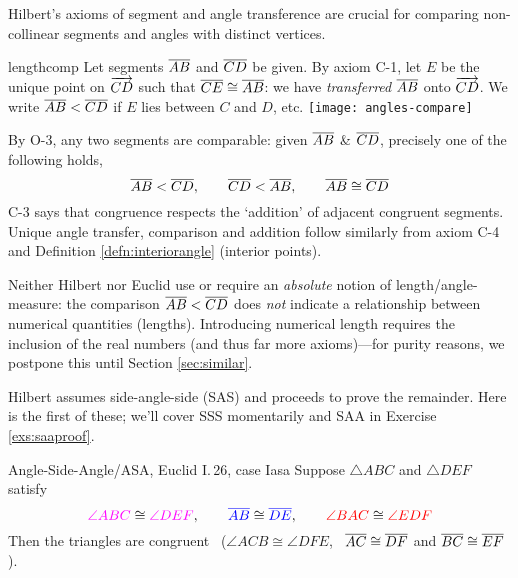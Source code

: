 
Hilbert's axioms of segment and angle transference are crucial for comparing non-collinear segments and angles with distinct vertices.


\begin{defn}[lower separated=false, sidebyside, sidebyside align=top seam, sidebyside gap=0pt, righthand width=0.35\linewidth]{}{lengthcomp}
	Let segments $\overline{AB}$ and $\overline{CD}$ be given.\smallbreak
	By axiom C-1, let $E$ be the unique point on $\overrightarrow{CD}$ such that $\overline{CE}\cong\overline{AB}$: we have \emph{transferred} $\overline{AB}$ onto $\overrightarrow{CD}$.\smallbreak
	We write $\overline{AB}<\overline{CD}$ if $E$ lies between $C$ and $D$, etc.
	\tcblower
	\flushright
	\texttt{[image: angles-compare]}
\end{defn}

By O-3, any two segments are comparable: given $\overline{AB}$ \& $\overline{CD}$, precisely one of the following holds,
\[
	\overline{AB}<\overline{CD}, \qquad \overline{CD}<\overline{AB}, \qquad\overline{AB}\cong\overline{CD}
\]
C-3 says that congruence respects the `addition' of adjacent congruent segments. Unique angle transfer, comparison and addition follow similarly from axiom C-4 and Definition \ref{defn:interiorangle} (interior points).\smallbreak

Neither Hilbert nor Euclid use or require an \emph{absolute} notion of length/angle-measure: the comparison $\overline{AB}<\overline{CD}$ does \emph{not} indicate a relationship between numerical quantities (lengths). Introducing numerical length requires the inclusion of the real numbers (and thus far more axioms)---for purity reasons, we postpone this until Section \ref{sec:similar}.
 

\goodbreak


Hilbert assumes side-angle-side (SAS) and proceeds to prove the remainder. Here is the first of these; we'll cover SSS momentarily and SAA in Exercise \ref{exs:saaproof}.

\begin{thm}{Angle-Side-Angle/ASA, Euclid I.\,26, case I}{asa}
	Suppose $\triangle ABC$ and $\triangle DEF$ satisfy
	\[
		\textcolor{Magenta}{\angle ABC}\cong\textcolor{Magenta}{\angle DEF},\qquad \textcolor{blue}{\cl{AB}}\cong\textcolor{blue}{\cl{DE}},\qquad \textcolor{red}{\angle BAC}\cong\textcolor{red}{\angle EDF}
	\]
	Then the triangles are congruent \ ($\angle ACB\cong\angle DFE$, \ $\overline{AC}\cong\overline{DF}$ and $\overline{BC}\cong\overline{EF}$).
\end{thm}

